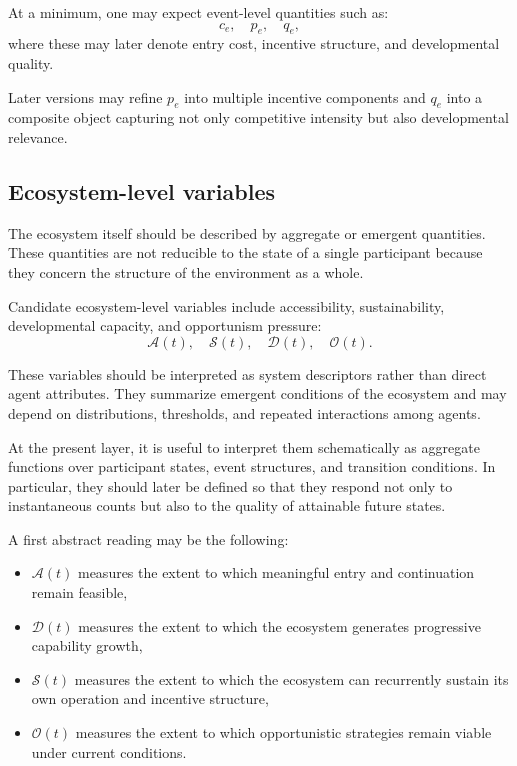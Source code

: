 \documentclass[11pt]{article}
\begin{document}
At a minimum, one may expect event-level quantities such as:
\[
c_e, \quad p_e, \quad q_e,
\]
where these may later denote entry cost, incentive structure, and developmental quality.

Later versions may refine \(p_e\) into multiple incentive components and \(q_e\) into a composite object capturing not only competitive intensity but also developmental relevance.

\subsection{Ecosystem-level variables}

The ecosystem itself should be described by aggregate or emergent quantities. These quantities are not reducible to the state of a single participant because they concern the structure of the environment as a whole.

Candidate ecosystem-level variables include accessibility, sustainability, developmental capacity, and opportunism pressure:
\[
\mathcal{A}(t), \quad \mathcal{S}(t), \quad \mathcal{D}(t), \quad \mathcal{O}(t).
\]

These variables should be interpreted as system descriptors rather than direct agent attributes. They summarize emergent conditions of the ecosystem and may depend on distributions, thresholds, and repeated interactions among agents.

At the present layer, it is useful to interpret them schematically as aggregate functions over participant states, event structures, and transition conditions. In particular, they should later be defined so that they respond not only to instantaneous counts but also to the quality of attainable future states.

A first abstract reading may be the following:
\begin{itemize}
  \item \(\mathcal{A}(t)\) measures the extent to which meaningful entry and continuation remain feasible,
  \item \(\mathcal{D}(t)\) measures the extent to which the ecosystem generates progressive capability growth,
  \item \(\mathcal{S}(t)\) measures the extent to which the ecosystem can recurrently sustain its own operation and incentive structure,
  \item \(\mathcal{O}(t)\) measures the extent to which opportunistic strategies remain viable under current conditions.
\end{itemize}
\end{document}
